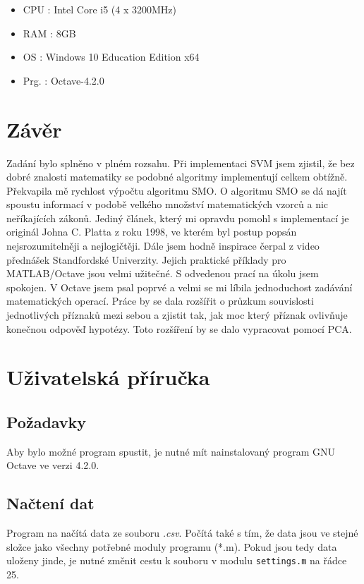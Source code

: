 \documentclass[a4]{article}
\begin{document}
\begin{itemize}
 \item CPU 	: Intel Core i5 (4 x 3200MHz)
 \item RAM 	: 8GB
 \item OS	: Windows 10 Education Edition x64
 \item Prg.	: Octave-4.2.0
\end{itemize}

\section{Závěr}
Zadání bylo splněno v plném rozsahu. Při implementaci SVM jsem zjistil, že bez dobré znalosti matematiky se podobné algoritmy implementují celkem obtížně. Překvapila mě rychlost výpočtu algoritmu SMO. O algoritmu SMO se dá najít spoustu informací v podobě velkého množství matematických vzorců a nic neříkajících zákonů. Jediný článek, který mi opravdu pomohl s implementací je originál Johna C. Platta z roku 1998, ve kterém byl postup popsán nejsrozumitelněji a nejlogičtěji. Dále jsem hodně inspirace čerpal z video přednášek Standfordské Univerzity. Jejich praktické příklady pro MATLAB/Octave jsou velmi užitečné. S odvedenou prací na úkolu jsem spokojen. V Octave jsem psal poprvé a velmi se mi líbila jednoduchost zadávání matematických operací. Práce by se dala rozšířit o průzkum souvislosti jednotlivých příznaků mezi sebou a zjistit tak, jak moc který příznak ovlivňuje konečnou odpověď hypotézy. Toto rozšíření by se dalo vypracovat pomocí PCA.

\section{Uživatelská příručka}
\subsection{Požadavky}
Aby bylo možné program spustit, je nutné mít nainstalovaný program GNU Octave ve verzi 4.2.0.

\subsection{Načtení dat}
Program na načítá data ze souboru \textit{.csv}. Počítá také s tím, že data jsou ve stejné složce jako všechny potřebné moduly programu (*.m). Pokud jsou tedy data uloženy jinde, je nutné změnit cestu k souboru v modulu \texttt{settings.m} na řádce 25.
\end{document}
